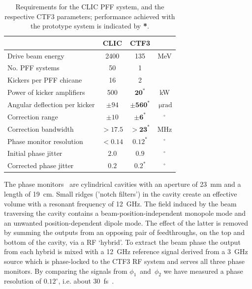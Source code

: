 \documentclass[%
 reprint,
 superscriptaddress,
 amsmath,
 amssymb,
 prl,
]{revtex4-1}
\begin{document}
\begin{table}
	\caption{\label{tab:pffspecs}
	    Requirements for the CLIC PFF system, and the respective CTF3 
	    parameters; performance achieved with the prototype system is indicated 
	    by \textbf{*}.}
\begin{ruledtabular}
	\begin{tabular}{lccc}
		 & CLIC & CTF3 \\
		\hline
		Drive beam energy & 2400 & 135 & MeV \\
		No. PFF systems & 50 & 1 & \\
		Kickers per PFF chicane & 16 & 2 & \\
		Power of kicker amplifiers & 500 & \(\mathbf{20^*}\) & kW \\
		Angular deflection per kicker & \(\pm94\) & 
		\(\mathbf{\pm560^*}\) & \(~\mathrm{\mu rad}\) \\
		Correction range & \(\pm 10\) & \(\mathbf{\pm 6^*}\) & \(^\circ\) \\
		Correction bandwidth & \(>17.5\) & \(\mathbf{>23^*}\) & MHz \\
		Phase monitor resolution & \(< 0.14\) & \(\mathbf{0.12^*}\) &  
		\(^\circ\)   \\
		Initial phase jitter & \(2.0\) & \(0.9\) &  \(^\circ\) \\
		Corrected phase jitter & \(0.2\) & \(\mathbf{0.2^*}\) &  \(^\circ\)  \\
	\end{tabular}
\end{ruledtabular}
\end{table}


The phase monitors~\cite{phMonEuCard} are cylindrical cavities with an aperture 
of 23~mm and a length of 19~cm. Small ridges (’notch filters’) in the cavity 
create an effective volume with a resonant frequency of 12~GHz. 
The field induced by the beam traversing the cavity 
contains a beam-position-independent monopole mode and an unwanted 
position-dependent dipole mode. The 
effect of the latter is removed by summing the outputs from an opposing pair 
of feedthroughs, on the top and bottom of the cavity, via a RF ‘hybrid’. 
To extract the beam phase the output from each hybrid 
is mixed with a 12~GHz reference signal derived from a 3~GHz source which is 
phase-locked to the CTF3 RF system and serves all three phase monitors.
By comparing the signals from \(\phi_1\)~and~\(\phi_2\) we have measured a 
phase resolution of \(0.12^\circ\), i.e. about 30~fs~\cite{RobertsThesis}.
\end{document}
